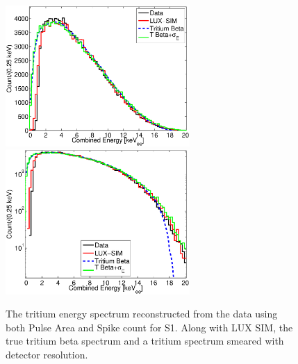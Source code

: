 \newpage

 \begin{figure}[h!]\centering
\includegraphics[width=70mm]{Chapter_Flucs/Figures/E_Spec/E_spec_compare_SIM.eps}
\includegraphics[width=70mm]{Chapter_Flucs/Figures/E_Spec/E_spec_compare_SIM_log_.eps}
\caption{The tritium energy spectrum reconstructed from the data using both Pulse Area and Spike count for S1. Along with LUX SIM, the true tritium beta spectrum and a tritium spectrum smeared with detector resolution. }
\label{fig:E_spec}
\end{figure}


